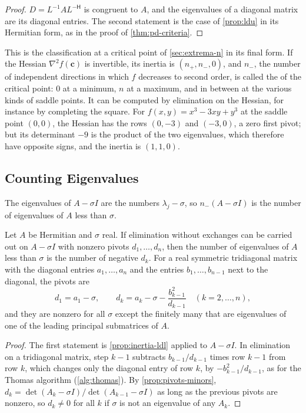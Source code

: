 \begin{proof}
$D=L^{-1}AL^{-\mathsf H}$ is congruent to $A$, and the eigenvalues of a diagonal matrix are its diagonal entries. The second statement is the case of \cref{prop:ldu} in its Hermitian form, as in the proof of \cref{thm:pd-criteria}.
\end{proof}

This is the classification at a critical point of \cref{sec:extrema-n} in its final form. If the Hessian $\nabla^2f(\mathbf c)$ is invertible, its inertia is $(n_+,n_-,0)$, and $n_-$, the number of independent directions in which $f$ decreases to second order, is called the  of the critical point: $0$ at a minimum, $n$ at a maximum, and in between at the various kinds of saddle points. It can be computed by elimination on the Hessian, for instance by completing the square. For $f(x,y)=x^3-3xy+y^3$ at the saddle point $(0,0)$, the Hessian has the rows $(0,-3)$ and $(-3,0)$, a zero first pivot; but its determinant $-9$ is the product of the two eigenvalues, which therefore have opposite signs, and the inertia is $(1,1,0)$.

\subsection{Counting Eigenvalues}

The eigenvalues of $A-\sigma I$ are the numbers $\lambda_j-\sigma$, so $n_-(A-\sigma I)$ is the number of eigenvalues of $A$ less than $\sigma$.

\begin{proposition}
\label{prop:eigen-count}
Let $A$ be Hermitian and $\sigma$ real. If elimination without exchanges can be carried out on $A-\sigma I$ with nonzero pivots $d_1,\ldots,d_n$, then the number of eigenvalues of $A$ less than $\sigma$ is the number of negative $d_k$. For a real symmetric tridiagonal matrix with the diagonal entries $a_1,\ldots,a_n$ and the entries $b_1,\ldots,b_{n-1}$ next to the diagonal, the pivots are
\[
d_1=a_1-\sigma,\qquad d_k=a_k-\sigma-\frac{b_{k-1}^2}{d_{k-1}}\quad(k=2,\ldots,n),
\]
and they are nonzero for all $\sigma$ except the finitely many that are eigenvalues of one of the leading principal submatrices of $A$.
\end{proposition}

\begin{proof}
The first statement is \cref{prop:inertia-ldl} applied to $A-\sigma I$. In elimination on a tridiagonal matrix, step $k-1$ subtracts $b_{k-1}/d_{k-1}$ times row $k-1$ from row $k$, which changes only the diagonal entry of row $k$, by $-b_{k-1}^2/d_{k-1}$, as for the Thomas algorithm (\cref{alg:thomas}). By \cref{prop:pivots-minors}, $d_k=\det(A_k-\sigma I)/\det(A_{k-1}-\sigma I)$ as long as the previous pivots are nonzero, so $d_k\ne0$ for all $k$ if $\sigma$ is not an eigenvalue of any $A_k$.
\end{proof}

